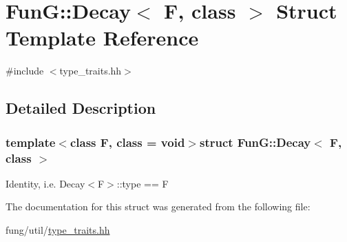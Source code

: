 \hypertarget{structFunG_1_1Decay}{\section{\-Fun\-G\-:\-:\-Decay$<$ \-F, class $>$ \-Struct \-Template \-Reference}
\label{structFunG_1_1Decay}
}


{\ttfamily \#include $<$type\-\_\-traits.\-hh$>$}



\subsection{\-Detailed \-Description}
\subsubsection*{template$<$class F, class = void$>$struct Fun\-G\-::\-Decay$<$ F, class $>$}

\-Identity, i.\-e. \-Decay$<$\-F$>$\-::type == \-F 

\-The documentation for this struct was generated from the following file\-:\begin{DoxyCompactItemize}
\item 
fung/util/\hyperlink{type__traits_8hh}{type\-\_\-traits.\-hh}\end{DoxyCompactItemize}
